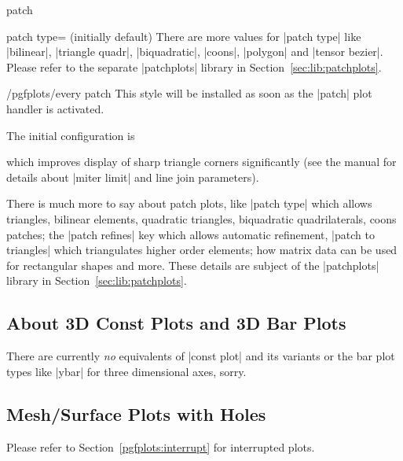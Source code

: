 {\begin{plottype}[/pgfplots]{patch}
\begin{pgfplotskey}{patch type= (initially default)}
        There are more values for |patch type| like |bilinear|,
        |triangle quadr|, |biquadratic|, |coons|, |polygon| and
        |tensor bezier|. Please refer to the separate |patchplots| library in
        Section~\ref{sec:lib:patchplots}.
    \end{pgfplotskey}

    \begin{stylekey}{/pgfplots/every patch}
        This style will be installed as soon as the |patch| plot handler is
        activated.

        The initial configuration is
\begin{codeexample}
\end{codeexample}
        \noindent which improves display of sharp triangle corners significantly
        (see the \Tikz{} manual for details about |miter limit| and line join
        parameters).
    \end{stylekey}

    There is much more to say about patch plots, like |patch type| which allows
    triangles, bilinear elements, quadratic triangles, biquadratic
    quadrilaterals, coons patches; the |patch refines| key which allows
    automatic refinement, |patch to triangles| which triangulates higher order
    elements;  how matrix data can be used for rectangular shapes and more.
    These details are subject of the |patchplots| library in
    Section~\ref{sec:lib:patchplots}.
\end{plottype}


\subsection{About 3D Const Plots and 3D Bar Plots}

There are currently \emph{no} equivalents of |const plot| and its variants or
the bar plot types like |ybar| for three dimensional axes, sorry.


\subsection{Mesh/Surface Plots with Holes}

Please refer to Section~\ref{pgfplots:interrupt} for interrupted plots.

}
